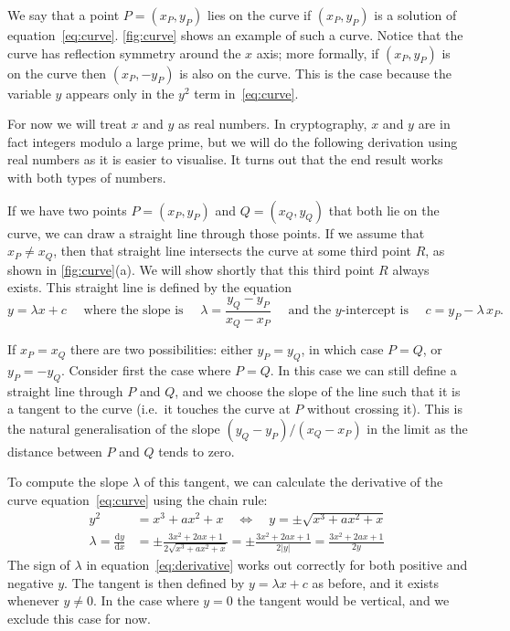 \documentclass{article}
\begin{document}
We say that a point $P = (x_P, y_P)$ lies on the curve if $(x_P, y_P)$ is a solution of equation~\eqref{eq:curve}.
\autoref{fig:curve} shows an example of such a curve.
Notice that the curve has reflection symmetry around the $x$ axis; more formally, if $(x_P, y_P)$ is on the curve then $(x_P, -y_P)$ is also on the curve.
This is the case because the variable $y$ appears only in the $y^2$ term in~\eqref{eq:curve}.

For now we will treat $x$ and $y$ as real numbers.
In cryptography, $x$ and $y$ are in fact integers modulo a large prime, but we will do the following derivation using real numbers as it is easier to visualise.
It turns out that the end result works with both types of numbers.

If we have two points $P=(x_P,y_P)$ and $Q=(x_Q,y_Q)$ that both lie on the curve, we can draw a straight line through those points.
If we assume that $x_P \neq x_Q$, then that straight line intersects the curve at some third point $R$, as shown in \autoref{fig:curve}(a).
We will show shortly that this third point $R$ always exists.
This straight line is defined by the equation
\begin{equation}
y = \lambda x + c \quad\text{ where the slope is }\quad
\lambda = \frac{y_Q - y_P}{x_Q - x_P} \quad\text{ and the $y$-intercept is }\quad c = y_P - \lambda\,x_P. \label{eq:line}
\end{equation}

If $x_P=x_Q$ there are two possibilities: either $y_P=y_Q$, in which case $P=Q$, or $y_P=-y_Q$.
Consider first the case where $P=Q$.
In this case we can still define a straight line through $P$ and $Q$, and we choose the slope of the line such that it is a tangent to the curve (i.e.\ it touches the curve at $P$ without crossing it).
This is the natural generalisation of the slope $(y_Q - y_P)/(x_Q - x_P)$ in the limit as the distance between $P$ and $Q$ tends to zero.

To compute the slope $\lambda$ of this tangent, we can calculate the derivative of the curve equation~\eqref{eq:curve} using the chain rule:
\begin{align}
y^2 &= x^3 + a x^2 + x \quad\iff\quad y = \pm\sqrt{x^3 + a x^2 + x}\\
\lambda = \frac{\mathrm{d}y}{\mathrm{d}x} &= \pm\frac{3x^2 + 2ax + 1}{2\sqrt{x^3 + ax^2 + x}}
= \pm\frac{3x^2 + 2ax + 1}{2|y|}
= \frac{3x^2 + 2ax + 1}{2y} \label{eq:derivative}
\end{align}
The sign of $\lambda$ in equation~\eqref{eq:derivative} works out correctly for both positive and negative $y$.
The tangent is then defined by $y = \lambda x + c$ as before, and it exists whenever $y \ne 0$.
In the case where $y=0$ the tangent would be vertical, and we exclude this case for now.
\end{document}
